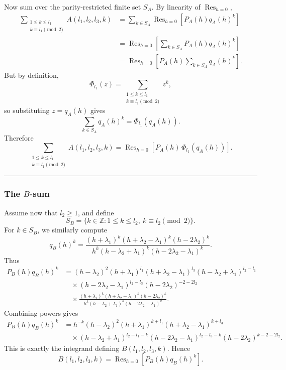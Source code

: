Now sum over the parity-restricted finite set \(S_A\). By linearity of \(\operatorname{Res}_{h=0}\),
\begin{align*}
\sum_{\substack{1\le k\le l_1\\ k\equiv l_1\pmod 2}}
A(l_1,l_2,l_3,k)
&=
\sum_{k\in S_A}
\operatorname{Res}_{h=0}\!\left[P_A(h)q_A(h)^k\right] \\
&=
\operatorname{Res}_{h=0}\!\left[
\sum_{k\in S_A} P_A(h)q_A(h)^k
\right] \\
&=
\operatorname{Res}_{h=0}\!\left[
P_A(h)\sum_{k\in S_A}q_A(h)^k
\right].
\end{align*}
But by definition,
\[
\Phi_{l_1}(z)
=
\sum_{\substack{1\le k\le l_1\\ k\equiv l_1\pmod 2}} z^k,
\]
so substituting \(z=q_A(h)\) gives
\[
\sum_{k\in S_A}q_A(h)^k
=
\Phi_{l_1}(q_A(h)).
\]
Therefore
\[
\boxed{
\sum_{\substack{1\le k\le l_1\\ k\equiv l_1\pmod2}} A(l_1,l_2,l_3,k)
=
\operatorname{Res}_{h=0}\!\left[P_A(h)\,\Phi_{l_1}(q_A(h))\right].
}
\]

\medskip\noindent\rule{\linewidth}{0.4pt}

\subsubsection*{The \(B\)-sum}

Assume now that \(l_2\ge 1\), and define
\[
S_B=\{k\in\mathbb{Z}:1\le k\le l_2,\ k\equiv l_2\pmod 2\}.
\]
For \(k\in S_B\), we similarly compute
\[
q_B(h)^k
=
\frac{(h+\lambda_1)^k(h+\lambda_2-\lambda_1)^k(h-2\lambda_2)^k}
{h^k(h-\lambda_2+\lambda_1)^k(h-2\lambda_2-\lambda_1)^k}.
\]
Thus
\begin{align*}
P_B(h)q_B(h)^k
&=
(h-\lambda_2)^2
(h+\lambda_1)^{l_1}
(h+\lambda_2-\lambda_1)^{l_3}
(h-\lambda_2+\lambda_1)^{l_2-l_1} \\
&\quad\times
(h-2\lambda_2-\lambda_1)^{l_2-l_3}
(h-2\lambda_2)^{-2-2l_2} \\
&\quad\times
\frac{(h+\lambda_1)^k(h+\lambda_2-\lambda_1)^k(h-2\lambda_2)^k}
{h^k(h-\lambda_2+\lambda_1)^k(h-2\lambda_2-\lambda_1)^k}.
\end{align*}
Combining powers gives
\begin{align*}
P_B(h)q_B(h)^k
&=
h^{-k}(h-\lambda_2)^2
(h+\lambda_1)^{k+l_1}
(h+\lambda_2-\lambda_1)^{k+l_3} \\
&\quad\times
(h-\lambda_2+\lambda_1)^{l_2-l_1-k}
(h-2\lambda_2-\lambda_1)^{l_2-l_3-k}
(h-2\lambda_2)^{k-2-2l_2}.
\end{align*}
This is exactly the integrand defining \(B(l_1,l_2,l_3,k)\). Hence
\[
B(l_1,l_2,l_3,k)
=
\operatorname{Res}_{h=0}\!\left[P_B(h)q_B(h)^k\right].
\]

